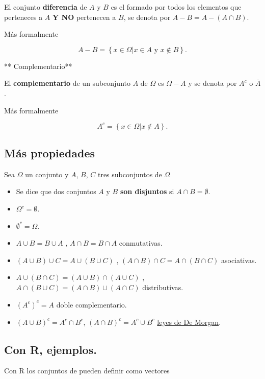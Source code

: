 \documentclass[
  letterpaper,
  DIV=11,
  numbers=noendperiod]{scrreprt}
\providecommand{\tightlist}{%
  \setlength{\itemsep}{0pt}\setlength{\parskip}{0pt}}\usepackage{longtable,booktabs,array}
\begin{document}
El conjunto \textbf{diferencia} de \(A\) y \(B\) es el formado por todos
los elementos que perteneces a \(A\) \textbf{Y NO} pertenecen a \(B\),
se denota por \(A-B=A-(A\cap B)\).

Más formalmente

\[
A- B=\left\{x\in\Omega \big| x\in A \mbox{ y } x\notin B\right\}.
\]

** Complementario**

El \textbf{complementario} de un subconjunto \(A\) de \(\Omega\) es
\(\Omega-A\) y se denota por \(A^c\) o \(\overline{A}\).

Más formalmente

\[
A^c=\left\{x\in\Omega \big| x\not\in A\right\}.
\]

\subsection{Más propiedades}\label{muxe1s-propiedades}

Sea \(\Omega\) un conjunto y \(A\), \(B\), \(C\) tres subconjuntos de
\(\Omega\)

\begin{itemize}
\tightlist
\item
  Se dice que dos conjuntos \(A\) y \(B\) \textbf{son disjuntos} si
  \(A\cap B=\emptyset.\)
\item
  \(\Omega^c=\emptyset\).
\item
  \(\emptyset^c=\Omega\).
\item
  \(A\cup B=B \cup A\) , \(A\cap B=B\cap A\) conmutativas.
\item
  \((A\cup B) \cup C = A \cup( B \cup C)\) ,
  \((A\cap B) \cap C = A \cap( B \cap C)\) asociativas.
\item
  \(A\cup (B\cap C)=(A\cup B) \cap (A\cup C)\) ,
  \(A\cap (B\cup C)=(A\cap B) \cup (A\cap C)\) distributivas.
\item
  \(\left(A^c\right)^c=A\) doble complementario.
\item
  \(\left(A\cup B\right)^c=A^c \cap B^c\),
  \(\left(A\cap B\right)^c=A^c \cup B^c\)
  \href{https://es.wikipedia.org/wiki/Leyes_de_De_Morgan}{leyes de De
  Morgan}.
\end{itemize}

\subsection{Con R, ejemplos.}\label{con-r-ejemplos.}

Con R los conjuntos de pueden definir como vectores
\end{document}
